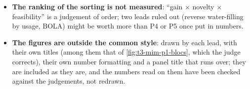 \begin{faux}
\begin{itemize}
\item \textbf{The ranking of the sorting is not measured}: ``gain $\times$ novelty $\times$ feasibility'' is a judgement of order; two leads ruled out (reverse water-filling by usage, BOLA) might be worth more than P4 or P5 once put in numbers.
\item \textbf{The figures are outside the common style}: drawn by each lead, with their own titles (among them that of \cref{fig:t3-mim-p1-blocs}, which the judge corrects), their own number formatting and a panel title that runs over; they are included as they are, and the numbers read on them have been checked against the judgements, not redrawn.
\end{itemize}
\end{faux}
